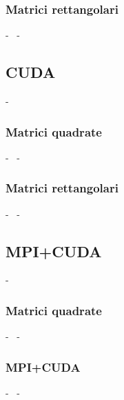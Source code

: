 \documentclass[compress]{beamer}
\begin{document}
\subsubsection*{Matrici rettangolari}
\begin{frame}{\secname \text{ }- \subsecname\ \text{ }- \subsubsecname}
\end{frame}

\subsection{CUDA}
\begin{frame}{\secname \text{ }- \subsecname\ }
\end{frame}

\subsubsection*{Matrici quadrate}
\begin{frame}{\secname \text{ }- \subsecname\ \text{ }- \subsubsecname}
\end{frame}

\subsubsection*{Matrici rettangolari}
\begin{frame}{\secname \text{ }- \subsecname\ \text{ }- \subsubsecname}
\end{frame}

\subsection{MPI+CUDA}
\begin{frame}{\secname \text{ }- \subsecname\ }
\end{frame}

\subsubsection*{Matrici quadrate}
\begin{frame}{\secname \text{ }- \subsecname\ \text{ }- \subsubsecname}
\end{frame}

\subsubsection*{MPI+CUDA}
\begin{frame}{\secname \text{ }- \subsecname\ \text{ }- \subsubsecname}
\end{frame}
\end{document}
